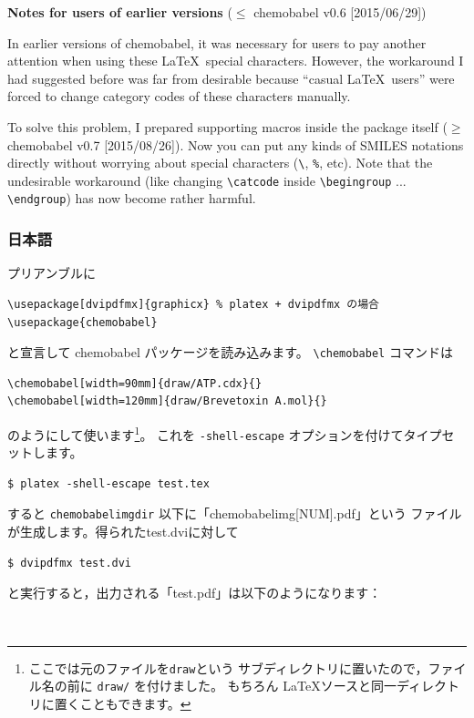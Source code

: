 \documentclass[12pt]{ltjsarticle}
\begin{document}
\noindent \textbf{Notes for users of earlier versions} ($\le$ \textsf{chemobabel} v0.6 [2015/06/29])

In earlier versions of \textsf{chemobabel}, it was necessary for users
to pay another attention when using these \LaTeX\ special characters.
However, the workaround I had suggested before was far from desirable
because ``casual \LaTeX\ users'' were forced to change category codes
of these characters manually.

To solve this problem, I prepared supporting macros inside the package
itself ($\ge$ \textsf{chemobabel} v0.7 [2015/08/26]).
Now you can put any kinds of SMILES notations directly without worrying
about special characters (\verb|\|, \verb|%|, etc).
Note that the undesirable workaround (like changing \verb|\catcode| inside
\verb|\begingroup| ... \verb|\endgroup|) has now become rather harmful.

\clearpage

\subsubsection{日本語}

プリアンブルに
\begin{verbatim}
\usepackage[dvipdfmx]{graphicx} % platex + dvipdfmx の場合
\usepackage{chemobabel}
\end{verbatim}
と宣言して \textsf{chemobabel} パッケージを読み込みます。
\verb|\chemobabel| コマンドは
\begin{verbatim}
\chemobabel[width=90mm]{draw/ATP.cdx}{}
\chemobabel[width=120mm]{draw/Brevetoxin A.mol}{}
\end{verbatim}
のようにして使います\footnote{ここでは元のファイルを\texttt{draw}という
サブディレクトリに置いたので，ファイル名の前に \texttt{draw/} を付けました。
もちろん \LaTeX ソースと同一ディレクトリに置くこともできます。}。
これを \verb|-shell-escape| オプションを付けてタイプセットします。
\begin{verbatim}
$ platex -shell-escape test.tex
\end{verbatim}
すると \verb|chemobabelimgdir| 以下に「chemobabelimg[NUM].pdf」という
ファイルが生成します。得られたtest.dviに対して
\begin{verbatim}
$ dvipdfmx test.dvi
\end{verbatim}
と実行すると，出力される「test.pdf」は以下のようになります：
\begin{figure}[h]
  \centering
   \\ \vspace{1cm}
\end{figure}
\end{document}

